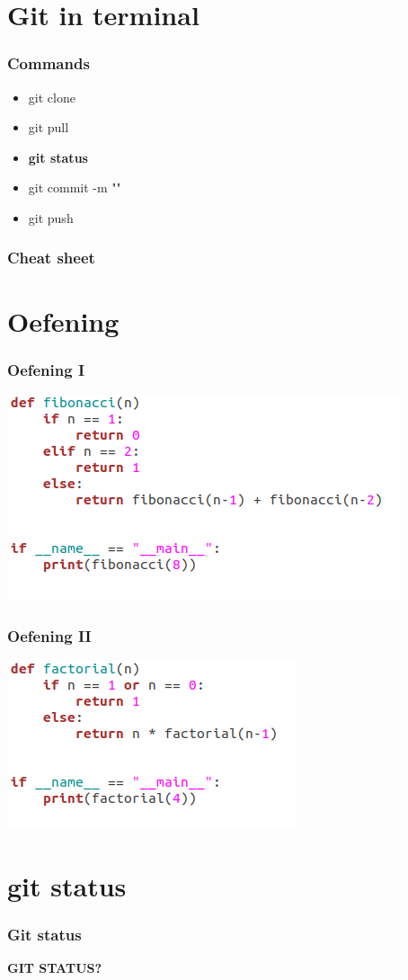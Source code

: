 	
	\section{Git in terminal}
	\begin{frame}
	\frametitle{Commands}
		\begin{itemize}
			\item git clone
			\item git pull
			\item \textbf{git status}
			\item git commit -m ""
			\item git push
		\end{itemize}
	\end{frame}
	
	\begin{frame}
	\frametitle{Cheat sheet}
	\end{frame}
	
	\section{Oefening}
	\begin{frame}
	\frametitle{Oefening I}
	\includegraphics[scale=0.5]{res/fib.png}
	\end{frame}
	
	\begin{frame}
	\frametitle{Oefening II}
	\includegraphics[scale=0.5]{res/fac.png}
	\end{frame}
	
	\section{git status}
	\begin{frame}
	\frametitle{Git status}
		\begin{center}
			{\Huge {\textbf{GIT STATUS?}}}
		\end{center}	
	\end{frame}

	
	
	
	
	
	

